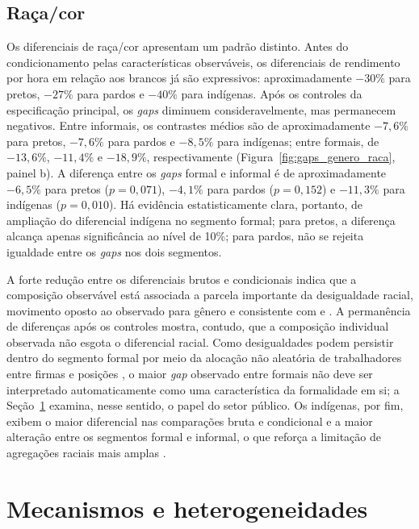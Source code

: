 \documentclass[12pt,a4paper]{article}
\begin{document}
\subsection{Raça/cor}
\label{subsec:resultados_raca}

Os diferenciais de raça/cor apresentam um padrão distinto. Antes do
condicionamento pelas características observáveis, os diferenciais de
rendimento por hora em relação aos brancos já são expressivos: aproximadamente
$-30\%$ para pretos, $-27\%$ para pardos e $-40\%$ para indígenas. Após os
controles da especificação principal, os \textit{gaps} diminuem
consideravelmente, mas permanecem negativos. Entre informais, os contrastes
médios são de aproximadamente $-7,6\%$ para pretos, $-7,6\%$ para pardos e
$-8,5\%$ para indígenas; entre formais, de $-13,6\%$, $-11,4\%$ e $-18,9\%$,
respectivamente (Figura~\ref{fig:gaps_genero_raca}, painel b). A diferença entre
os \textit{gaps} formal e informal é de aproximadamente $-6,5\%$ para pretos
($p=0,071$), $-4,1\%$ para pardos ($p=0,152$) e $-11,3\%$ para indígenas
($p=0,010$). Há evidência estatisticamente clara, portanto, de ampliação do
diferencial indígena no segmento formal; para pretos, a diferença alcança apenas
significância ao nível de 10\%; para pardos, não se rejeita igualdade entre os
\textit{gaps} nos dois segmentos.

A forte redução entre os diferenciais brutos e condicionais indica que a
composição observável está associada a parcela importante da desigualdade
racial, movimento oposto ao observado para gênero e consistente com
\citet{soares2000} e \citet{campante2004}. A permanência de diferenças após os
controles mostra, contudo, que a composição individual observada não esgota o
diferencial racial. Como desigualdades podem persistir dentro do segmento formal
por meio da alocação não aleatória de trabalhadores entre firmas e posições
\citep{gerard2021}, o maior \textit{gap} observado entre formais não deve ser
interpretado automaticamente como uma característica da formalidade em si; a
Seção~\ref{sec:mecanismos} examina, nesse sentido, o papel do setor público. Os
indígenas, por fim, exibem o maior diferencial nas comparações bruta e
condicional e a maior alteração entre os segmentos formal e informal, o que
reforça a limitação de agregações raciais mais amplas
\citep{canelas2014, canedo2019, kolev2015}.

\section{Mecanismos e heterogeneidades}
\label{sec:mecanismos}
\end{document}
